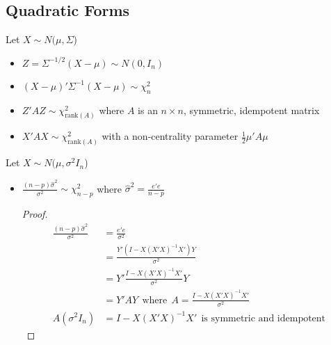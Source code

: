 \documentclass[12pt]{article}\usepackage{graphicx, color}
\theoremstyle{definition}
\newcommand{\rank}{\mathrm{rank}}
\renewcommand{\hat}{\widehat}
\begin{document}
\subsection{Quadratic Forms}
Let $X\sim N (\mu, \Sigma$)
\begin{itemize}
\item $Z=\Sigma^{-1/2}(X-\mu)\sim N (0, I_n)$
\item $(X-\mu)'\Sigma^{-1}(X-\mu)\sim \chi^2_n$
\item $Z'AZ\sim \chi^2_{\rank(A)}$ where $A$ is an $n\times n$, symmetric, idempotent matrix
\item $X'AX\sim \chi^2_{\rank(A)}$ with a non-centrality parameter $\frac{1}{2}\mu'A\mu$
\end{itemize}
Let $X\sim N (\mu, \sigma^2I_n$)
\begin{itemize}
\item $\frac{(n-p)\hat\sigma^2}{\sigma^2} \sim \chi^2_{n-p}$ where $\hat \sigma^2 =\frac{e'e}{n-p}$
\begin{proof}
\begin{align*}
\frac{(n-p)\hat\sigma^2}{\sigma^2}&=\frac{e'e}{\sigma^2}\\
&=\frac{Y'(I-X(X'X)^{-1}X')Y}{\sigma^2}\\
&=Y'\frac{I-X(X'X)^{-1}X'}{\sigma^2}Y\\
&=Y'AY~~\text{where}~~A=\frac{I-X(X'X)^{-1}X'}{\sigma^2}\\
A(\sigma^2 I_n) &=I-X(X'X)^{-1}X'~~\text{is symmetric and idempotent}
\end{align*}
\end{proof}
\end{itemize}
\end{document}
